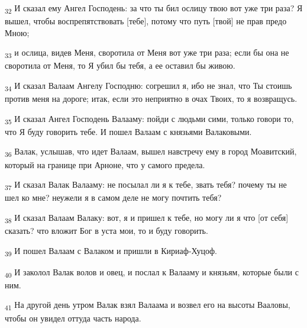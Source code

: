 \begin{tcolorbox}
\textsubscript{32} И сказал ему Ангел Господень: за что ты бил ослицу твою вот уже три раза? Я вышел, чтобы воспрепятствовать [тебе], потому что путь [твой] не прав предо Мною;
\end{tcolorbox}
\begin{tcolorbox}
\textsubscript{33} и ослица, видев Меня, своротила от Меня вот уже три раза; если бы она не своротила от Меня, то Я убил бы тебя, а ее оставил бы живою.
\end{tcolorbox}
\begin{tcolorbox}
\textsubscript{34} И сказал Валаам Ангелу Господню: согрешил я, ибо не знал, что Ты стоишь против меня на дороге; итак, если это неприятно в очах Твоих, то я возвращусь.
\end{tcolorbox}
\begin{tcolorbox}
\textsubscript{35} И сказал Ангел Господень Валааму: пойди с людьми сими, только говори то, что Я буду говорить тебе. И пошел Валаам с князьями Валаковыми.
\end{tcolorbox}
\begin{tcolorbox}
\textsubscript{36} Валак, услышав, что идет Валаам, вышел навстречу ему в город Моавитский, который на границе при Арноне, что у самого предела.
\end{tcolorbox}
\begin{tcolorbox}
\textsubscript{37} И сказал Валак Валааму: не посылал ли я к тебе, звать тебя? почему ты не шел ко мне? неужели я в самом деле не могу почтить тебя?
\end{tcolorbox}
\begin{tcolorbox}
\textsubscript{38} И сказал Валаам Валаку: вот, я и пришел к тебе, но могу ли я что [от себя] сказать? что вложит Бог в уста мои, то и буду говорить.
\end{tcolorbox}
\begin{tcolorbox}
\textsubscript{39} И пошел Валаам с Валаком и пришли в Кириаф-Хуцоф.
\end{tcolorbox}
\begin{tcolorbox}
\textsubscript{40} И заколол Валак волов и овец, и послал к Валааму и князьям, которые были с ним.
\end{tcolorbox}
\begin{tcolorbox}
\textsubscript{41} На другой день утром Валак взял Валаама и возвел его на высоты Вааловы, чтобы он увидел оттуда часть народа.
\end{tcolorbox}
